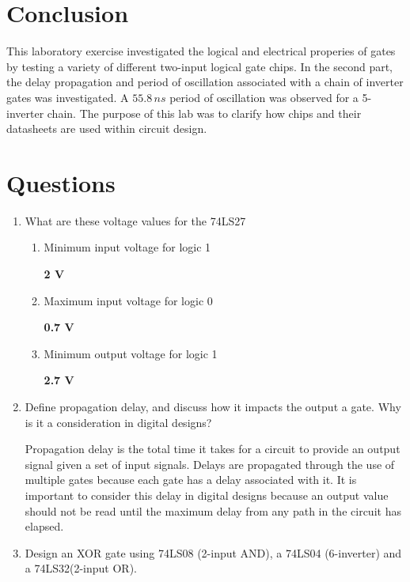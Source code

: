 \documentclass[CMPE]{KGCOEReport}
\begin{document}
\section*{Conclusion}

This laboratory exercise investigated the logical and electrical properies of gates by testing a variety of different two-input logical gate chips. In the second part, the delay propagation and period of oscillation associated with a chain of inverter gates was investigated. A $55.8\,ns$ period of oscillation was observed for a 5-inverter chain. The purpose of this lab was to clarify how chips and their datasheets are used within circuit design. 

\section*{Questions}

\begin{enumerate}
  \item What are these voltage values for the 74LS27
  \begin{enumerate}
  	\item Minimum input voltage for logic 1
  	
  	\textbf{2 V}
  	
  	\item Maximum input voltage for logic 0
  	
  	\textbf{0.7 V}
  	
  	\item Minimum output voltage for logic 1
  	
  	\textbf{2.7 V}
  \end{enumerate}
  
  \item Define propagation delay, and discuss how it impacts the output a gate. Why is it a consideration in digital designs?
  
  Propagation delay is the total time it takes for a circuit to provide an output signal given a set of input signals. Delays are propagated through the use of multiple gates because each gate has a delay associated with it. It is important to consider this delay in digital designs because an output value should not be read until the maximum delay from any path in the circuit has elapsed.
  
  \pagebreak
  \item Design an XOR gate using 74LS08 (2-input AND), a 74LS04 (6-inverter) and a 74LS32(2-input OR). 
\end{enumerate}
\end{document}
